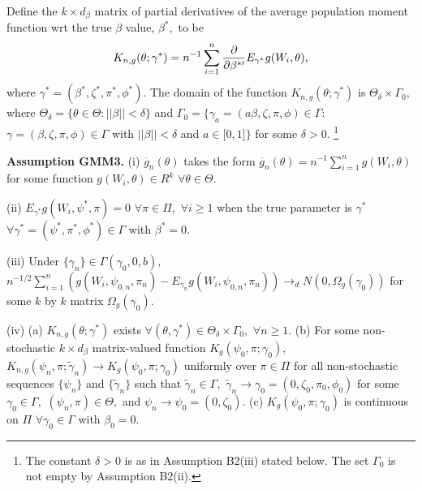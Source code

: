 \documentclass[12pt,titlepage,final,oneside,letterpaper]{article}
\begin{document}
Define the $k\times d_{\beta }$ matrix of partial derivatives of the average
population moment function wrt the true $\beta $ value, $\beta ^{\ast },$ to
be%
\begin{equation}
K_{n,g}(\theta ;\gamma ^{\ast })=n^{-1}\sum_{i=1}^{n}\frac{\partial }{%
\partial \beta ^{\ast \prime }}E_{\gamma ^{\ast }}g(W_{i},\theta ),
\label{exp fn2}
\end{equation}%
where $\gamma ^{\ast }=(\beta ^{\ast },\zeta ^{\ast },\pi ^{\ast },\phi
^{\ast }).$ The domain of the function $K_{n,g}(\theta ;\gamma ^{\ast })$ is 
$\Theta _{\delta }\times \Gamma _{0},$ where $\Theta _{\delta }=\{\theta \in
\Theta :||\beta ||<\delta \}$ and $\Gamma _{0}=\{\gamma _{a}=(a\beta ,\zeta
,\pi ,\phi )\in \Gamma :$ $\gamma =(\beta ,\zeta ,\pi ,\phi )\in \Gamma $
with $||\beta ||<\delta $ and $a\in \lbrack 0,1]\}$ for some $\delta >0.$%
\footnote{%
The constant $\delta >0$ is as in Assumption B2(iii) stated below. The set $%
\Gamma _{0}$ is not empty by Assumption B2(ii).}\medskip

\noindent \textbf{Assumption GMM3.} (i) $\overline{g}_{n}\left( \theta
\right) $ takes the form $\overline{g}_{n}(\theta
)=n^{-1}\sum_{i=1}^{n}g(W_{i},\theta )$ for some function $g\left(
W_{i},\theta \right) \in R^{k}$ $\forall \theta \in \Theta .$

\noindent (ii) $E_{\gamma ^{\ast }}g(W_{i},\psi ^{\ast },\pi )=0$ $\forall
\pi \in \Pi ,$ $\forall i\geq 1$ when the true parameter is $\gamma ^{\ast }$
$\forall \gamma ^{\ast }=(\psi ^{\ast },\pi ^{\ast },\phi ^{\ast })\in
\Gamma $ with $\beta ^{\ast }=0.$

\noindent (iii) Under $\{\gamma _{n}\}\in \Gamma (\gamma _{0},0,b),$ $%
n^{-1/2}\sum_{i=1}^{n}(g(W_{i},\psi _{0,n},\pi _{n})-E_{\gamma
_{n}}g(W_{i},\psi _{0,n},\pi _{n}))\rightarrow _{d}N(0,\allowbreak \Omega
_{g}(\gamma _{0}))$ for some $k$ by $k$ matrix $\Omega _{g}(\gamma _{0}).$

\noindent (iv) (a) $K_{n,g}(\theta ;\gamma ^{\ast })$ exists $\forall
(\theta ,\gamma ^{\ast })\in \Theta _{\delta }\times \Gamma _{0},$ $\forall
n\geq 1.$ (b) For some non-stochastic $k\times d_{\beta }$ matrix-valued
function $K_{g}(\psi _{0},\pi ;\gamma _{0}),$ $K_{n,g}(\psi _{n},\pi ;%
\widetilde{\gamma }_{n})\rightarrow K_{g}(\psi _{0},\pi ;\gamma _{0})$
uniformly over $\pi \in \Pi $ for all non-stochastic sequences $\{\psi
_{n}\} $ and $\{\widetilde{\gamma }_{n}\}$ such that $\widetilde{\gamma }%
_{n}\in \Gamma ,$ $\widetilde{\gamma }_{n}\rightarrow \gamma _{0}=(0,\zeta
_{0},\pi _{0},\phi _{0})$ for some $\gamma _{0}\in \Gamma ,$ $(\psi _{n},\pi
)\in \Theta ,$ and $\psi _{n}\rightarrow \psi _{0}=(0,\zeta _{0}).$ (c) $%
K_{g}(\psi _{0},\pi ;\gamma _{0})$ is continuous on $\Pi $ $\forall \gamma
_{0}\in \Gamma $ with $\beta _{0}=0.$
\end{document}
